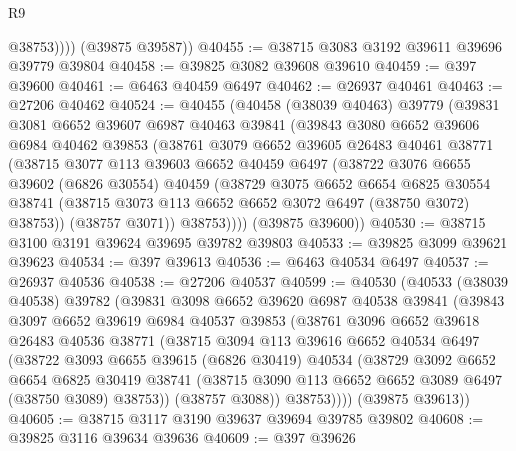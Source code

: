 \begin{lexlean}{R9}
\begin{coremodule}
              @38753))))
      (@39875 @39587))
@40455 := @38715 @3083 @3192 @39611 @39696 @39779 @39804
@40458 := @39825 @3082 @39608 @39610
@40459 := @397 @39600
@40461 := @6463 @40459 @6497
@40462 := @26937 @40461
@40463 := @27206 @40462
@40524 := @40455
    (@40458
      (@38039 @40463)
      @39779
      (@39831
        @3081
        @6652
        @39607
        @6987
        @40463
        @39841
        (@39843
          @3080
          @6652
          @39606
          @6984
          @40462
          @39853
          (@38761
            @3079
            @6652
            @39605
            @26483
            @40461
            @38771
            (@38715
              @3077
              @113
              @39603
              @6652
              @40459
              @6497
              (@38722
                @3076
                @6655
                @39602
                (@6826 @30554)
                @40459
                (@38729
                  @3075
                  @6652
                  @6654
                  @6825
                  @30554
                  @38741
                  (@38715 @3073 @113 @6652 @6652 @3072 @6497 (@38750 @3072) @38753))
                (@38757 @3071))
              @38753))))
      (@39875 @39600))
@40530 := @38715 @3100 @3191 @39624 @39695 @39782 @39803
@40533 := @39825 @3099 @39621 @39623
@40534 := @397 @39613
@40536 := @6463 @40534 @6497
@40537 := @26937 @40536
@40538 := @27206 @40537
@40599 := @40530
    (@40533
      (@38039 @40538)
      @39782
      (@39831
        @3098
        @6652
        @39620
        @6987
        @40538
        @39841
        (@39843
          @3097
          @6652
          @39619
          @6984
          @40537
          @39853
          (@38761
            @3096
            @6652
            @39618
            @26483
            @40536
            @38771
            (@38715
              @3094
              @113
              @39616
              @6652
              @40534
              @6497
              (@38722
                @3093
                @6655
                @39615
                (@6826 @30419)
                @40534
                (@38729
                  @3092
                  @6652
                  @6654
                  @6825
                  @30419
                  @38741
                  (@38715 @3090 @113 @6652 @6652 @3089 @6497 (@38750 @3089) @38753))
                (@38757 @3088))
              @38753))))
      (@39875 @39613))
@40605 := @38715 @3117 @3190 @39637 @39694 @39785 @39802
@40608 := @39825 @3116 @39634 @39636
@40609 := @397 @39626

\end{coremodule}
\end{lexlean}
